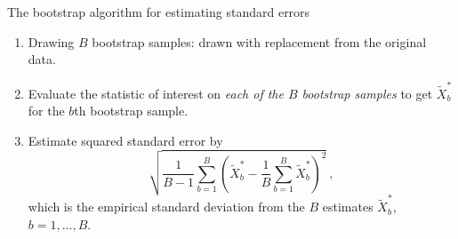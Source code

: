 \documentclass[
  10pt,
  ignorenonframetext,
]{beamer}
\providecommand{\tightlist}{%
  \setlength{\itemsep}{0pt}\setlength{\parskip}{0pt}}
\begin{document}
\begin{frame}
\begin{block}{The bootstrap algorithm for estimating standard errors}
\protect\hypertarget{the-bootstrap-algorithm-for-estimating-standard-errors}{}
\(~\)

\begin{enumerate}
\tightlist
\item
  Drawing \(B\) bootstrap samples: drawn with replacement from the
  original data.
\end{enumerate}

\vspace{2mm}

\begin{enumerate}
\setcounter{enumi}{1}
\tightlist
\item
  Evaluate the statistic of interest on \emph{each of the \(B\)
  bootstrap samples} to get \(\tilde{X}^*_b\) for the \(b\)th bootstrap
  sample.
\end{enumerate}

\vspace{2mm}

\begin{enumerate}
\setcounter{enumi}{2}
\tightlist
\item
  Estimate squared standard error by
  \[\sqrt{\frac{1}{B-1}\sum_{b=1}^B (\tilde{X}^*_b-\frac{1}{B}\sum_{b=1}^B \tilde{X}^*_b)^2} \ ,\]
  which is the empirical standard deviation from the \(B\) estimates
  \(\tilde{X}^*_b\), \(b=1,\ldots,B\).
\end{enumerate}
\end{block}
\end{frame}
\end{document}
